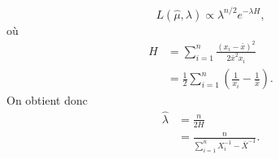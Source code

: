\begin{exercice}
\begin{sol}
\begin{displaymath}
      L(\hat{\mu}, \lambda) \propto \lambda^{n/2} e^{-\lambda H},
    \end{displaymath}
    où
    \begin{align*}
      H &= \sum_{i = 1}^n \frac{(x_i - \bar{x})^2}{2 \bar{x}^2 x_i} \\
      &= \frac{1}{2} \sum_{i = 1}^n
      \left(
        \frac{1}{x_i} - \frac{1}{\bar{x}}
      \right).
    \end{align*}
    On obtient donc
    \begin{align*}
      \hat{\lambda} &= \frac{n}{2H}\\
      &= \frac{n}{\sum_{i = 1}^n X_i^{-1} - \bar{X}^{-1}}.
    \end{align*}
  \end{sol}
\end{exercice}


